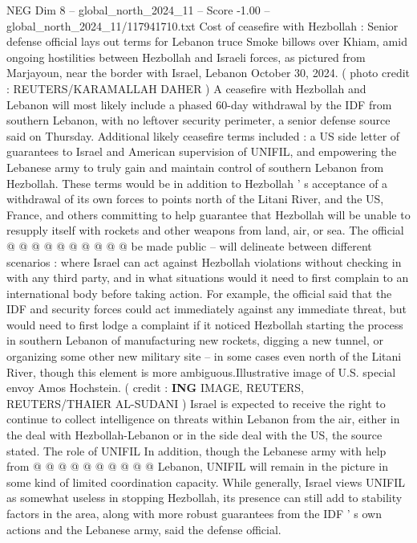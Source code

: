 \begin{textsample}{NEG Dim 8 – global\_north\_2024\_11 – Score -1.00 – global\_north\_2024\_11/117941710.txt}  \label{ex:f8_neg_394}
Cost of ceasefire with Hezbollah : Senior defense official lays out terms for Lebanon truce Smoke billows over Khiam, amid ongoing hostilities between Hezbollah and Israeli forces, as pictured from Marjayoun, near the border with Israel, Lebanon October 30, 2024. ( photo credit : REUTERS/KARAMALLAH DAHER ) A ceasefire with Hezbollah and Lebanon will most likely include a phased 60-day withdrawal by the IDF from southern Lebanon, with no leftover security perimeter, a senior defense source said on Thursday.
Additional likely ceasefire terms included : a US side letter of guarantees to Israel and American supervision of UNIFIL, and empowering the Lebanese army to truly gain and maintain control of southern Lebanon from Hezbollah.
These terms would be in addition to Hezbollah ' s acceptance of a withdrawal of its own forces to points north of the Litani River, and the US, France, and others committing to help guarantee that Hezbollah will be unable to resupply itself with rockets and other weapons from land, air, or sea.
The official @ @ @ @ @ @ @ @ @ @ be made public -- will delineate between different scenarios : where Israel can act against Hezbollah violations without checking in with any third party, and in what situations would it need to first complain to an international body before taking action.
For example, the official said that the IDF and security forces could act immediately against any immediate threat, but would need to first lodge a complaint if it noticed Hezbollah starting the process in southern Lebanon of manufacturing new rockets, digging a new tunnel, or organizing some other new military site -- in some cases even north of the Litani River, though this element is more ambiguous.Illustrative image of U.S. special envoy Amos Hochstein. ( credit : \textbf{ING} IMAGE, REUTERS, REUTERS/THAIER AL-SUDANI ) Israel is expected to receive the right to continue to collect intelligence on threats within Lebanon from the air, either in the deal with Hezbollah-Lebanon or in the side deal with the US, the source stated.
The role of UNIFIL In addition, though the Lebanese army with help from @ @ @ @ @ @ @ @ @ @ Lebanon, UNIFIL will remain in the picture in some kind of limited coordination capacity.
While generally, Israel views UNIFIL as somewhat useless in stopping Hezbollah, its presence can still add to stability factors in the area, along with more robust guarantees from the IDF ' s own actions and the Lebanese army, said the defense official.

\end{textsample}
